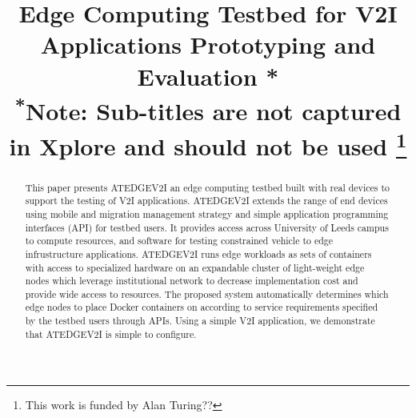 \documentclass[conference]{IEEEtran}
\begin{document}
\title{Edge Computing Testbed for V2I Applications Prototyping and Evaluation *\\
{\footnotesize \textsuperscript{*}Note: Sub-titles are not captured in Xplore and
should not be used}
\thanks{This work is funded by Alan Turing??}
}

\author{
\and
{}
\and
{}
}

\maketitle

\begin{abstract}
This paper presents ATEDGEV2I an edge computing testbed built with real devices to support the testing of V2I applications. ATEDGEV2I extends the range of end devices using mobile and migration management strategy and simple application programming interfaces (API) for testbed users. It provides access across University of Leeds campus to compute resources, and software for testing constrained vehicle to edge infrustructure applications. ATEDGEV2I runs edge workloads as sets of containers with access to specialized hardware on an expandable cluster of light-weight edge nodes which leverage institutional network to decrease implementation cost and provide wide access to resources. 
The proposed system automatically determines which edge nodes to place Docker containers on according to service requirements specified by the testbed users through APIs. Using a simple V2I application, we demonstrate that ATEDGEV2I is simple to configure.
\end{abstract}
\end{document}
